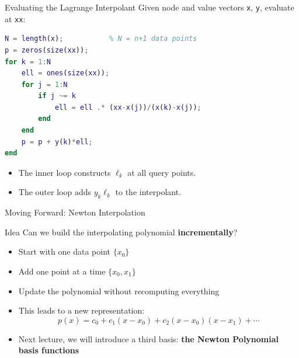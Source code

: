 \documentclass[10pt]{beamer}
\begin{document}
\begin{frame}[fragile]{Evaluating the Lagrange Interpolant}
Given node and value vectors \texttt{x}, \texttt{y}, evaluate at \texttt{xx}:
\begin{lstlisting}[language=matlab,basicstyle=\ttfamily\small]
N = length(x);           % N = n+1 data points
p = zeros(size(xx));
for k = 1:N
    ell = ones(size(xx));
    for j = 1:N
        if j ~= k
            ell = ell .* (xx-x(j))/(x(k)-x(j));
        end
    end
    p = p + y(k)*ell;
end
\end{lstlisting}
\begin{itemize}
    \item The inner loop constructs $\ell_k$ at all query points.
    \item The outer loop adds $y_k\ell_k$ to the interpolant.
\end{itemize}
\end{frame}
\begin{frame}{Moving Forward: Newton Interpolation}

\begin{block}{Idea}
Can we build the interpolating polynomial \textbf{incrementally}?
\end{block}

\begin{itemize}

\item Start with one data point $\{x_0\}$
\item Add one point at a time $\{x_0, x_1\}$
\item Update the polynomial without recomputing everything

\vspace{3mm}

\item This leads to a new representation:
\[
p(x) = c_0 
      + c_1(x-x_0)
      + c_2(x-x_0)(x-x_1)
      + \cdots
\]

\item Next lecture, we will introduce a third basis: \textbf{the Newton Polynomial basis functions} 
\end{itemize}


\end{frame}

\end{document}
